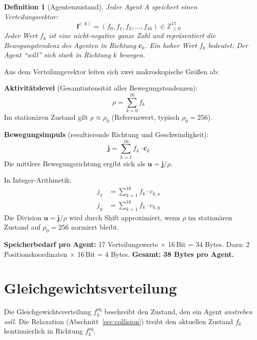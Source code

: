 \documentclass[11pt,a4paper]{article}
\newtheorem{definition}{Definition}
\newcommand{\feq}{f^{\mathrm{eq}}}
\begin{document}
\begin{definition}[Agentenzustand]
Jeder Agent $A$ speichert einen Verteilungsvektor:
\begin{equation}
\mathbf{f}^{(A)} = (f_0, f_1, f_2, \ldots, f_{16}) \in \mathbb{Z}_{\geq 0}^{17}
\end{equation}
Jeder Wert $f_k$ ist eine nicht-negative ganze Zahl und repr\"asentiert die
\textit{Bewegungstendenz} des Agenten in Richtung $\mathbf{c}_k$.
Ein hoher Wert $f_k$ bedeutet: Der Agent ``will'' sich stark in Richtung $k$ bewegen.
\end{definition}

\noindent Aus dem Verteilungsvektor leiten sich zwei makroskopische Gr\"o\ss en ab:

\textbf{Aktivit\"atslevel} (Gesamtintensit\"at aller Bewegungstendenzen):
\begin{equation}
\rho = \sum_{k=0}^{16} f_k
\end{equation}
Im station\"aren Zustand gilt $\rho \approx \rho_0$ (Referenzwert, typisch $\rho_0 = 256$).

\textbf{Bewegungsimpuls} (resultierende Richtung und Geschwindigkeit):
\begin{equation}
\mathbf{j} = \sum_{k=1}^{16} f_k \cdot \mathbf{c}_k
\end{equation}
Die mittlere Bewegungsrichtung ergibt sich als $\mathbf{u} = \mathbf{j} / \rho$.

In Integer-Arithmetik:
\begin{align}
j_x &= \sum_{k=1}^{16} f_k \cdot c_{k,x} \label{eq:jx}\\
j_y &= \sum_{k=1}^{16} f_k \cdot c_{k,y} \label{eq:jy}
\end{align}
Die Division $\mathbf{u} = \mathbf{j}/\rho$ wird durch Shift approximiert,
wenn $\rho$ im station\"aren Zustand auf $\rho_0 = 256$ normiert bleibt.

\textbf{Speicherbedarf pro Agent:} 17 Verteilungswerte $\times$ 16\,Bit = 34 Bytes.
Dazu: 2 Positionskoordinaten $\times$ 16\,Bit = 4 Bytes.
\textbf{Gesamt: 38 Bytes pro Agent.}

\section{Gleichgewichtsverteilung}

Die Gleichgewichtsverteilung $\feq_k$ beschreibt den Zustand, den ein Agent
\textit{anstreben soll}. Die Relaxation (Abschnitt~\ref{sec:collision}) treibt
den aktuellen Zustand $f_k$ kontinuierlich in Richtung $\feq_k$.
\end{document}
